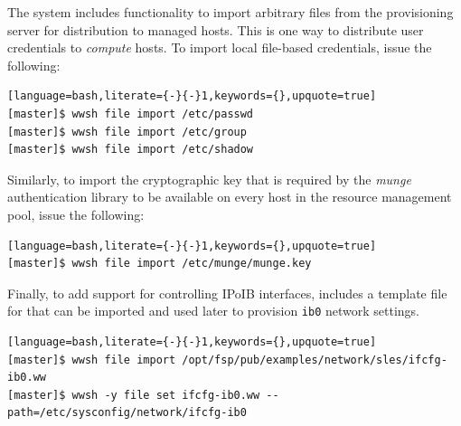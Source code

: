 \documentclass[letterpaper]{article}
\begin{document}
The \Warewulf{} system includes functionality to import arbitrary files from the
provisioning server for distribution to managed hosts. This is one way
to distribute user credentials to {\em compute} hosts. To
import local file-based credentials, issue the following:

\begin{lstlisting}[language=bash,literate={-}{-}1,keywords={},upquote=true]
[master]$ wwsh file import /etc/passwd                                                          
[master]$ wwsh file import /etc/group
[master]$ wwsh file import /etc/shadow 
\end{lstlisting}

\newpage
Similarly, to import the cryptographic key that is required by the {\em munge}
authentication library to be available on every host in the resource management
pool, issue the following:

\begin{lstlisting}[language=bash,literate={-}{-}1,keywords={},upquote=true]
[master]$ wwsh file import /etc/munge/munge.key
\end{lstlisting}

Finally, to add support for controlling IPoIB interfaces, \FSP{} includes a
template file for \Warewulf{} that can be imported and used later to provision
\texttt{ib0} network settings.

\begin{lstlisting}[language=bash,literate={-}{-}1,keywords={},upquote=true]
[master]$ wwsh file import /opt/fsp/pub/examples/network/sles/ifcfg-ib0.ww
[master]$ wwsh -y file set ifcfg-ib0.ww --path=/etc/sysconfig/network/ifcfg-ib0
\end{lstlisting}



\end{document}
